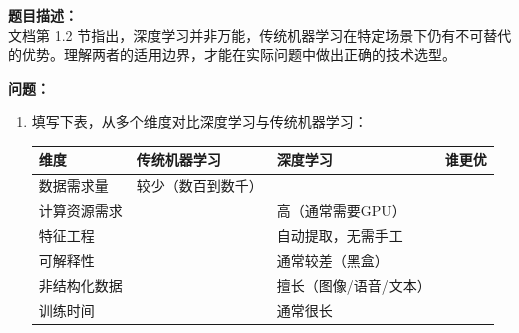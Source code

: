 \documentclass[a4paper,11pt]{ctexart}
\begin{document}
\begin{problembox}
    \textbf{题目描述：}\\
    文档第 1.2 节指出，深度学习并非万能，传统机器学习在特定场景下仍有不可替代的优势。理解两者的适用边界，才能在实际问题中做出正确的技术选型。

    \vspace{0.3cm}
    \textbf{问题：}
    \begin{enumerate}[(1)]
        \item 填写下表，从多个维度对比深度学习与传统机器学习：

        \begin{center}
        \begin{tabular}{p{3.0cm} p{3.5cm} p{3.5cm} p{2.0cm}}
            \toprule
            维度 & 传统机器学习 & 深度学习 & 谁更优 \\
            \midrule
            数据需求量 & 较少（数百到数千） & \underline{\hspace{3.0cm}} & \underline{\hspace{1.5cm}} \\[1.2em]
            计算资源需求 & \underline{\hspace{3.0cm}} & 高（通常需要GPU） & \underline{\hspace{1.5cm}} \\[1.2em]
            特征工程 & \underline{\hspace{3.0cm}} & 自动提取，无需手工 & \underline{\hspace{1.5cm}} \\[1.2em]
            可解释性 & \underline{\hspace{3.0cm}} & 通常较差（黑盒） & \underline{\hspace{1.5cm}} \\[1.2em]
            非结构化数据 & \underline{\hspace{3.0cm}} & 擅长（图像/语音/文本） & \underline{\hspace{1.5cm}} \\[1.2em]
            训练时间 & \underline{\hspace{3.0cm}} & 通常很长 & \underline{\hspace{1.5cm}} \\
            \bottomrule
        \end{tabular}
        \end{center}


\end{enumerate}
\end{problembox}
\end{document}
